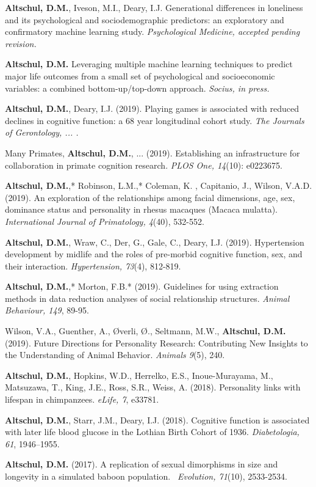 \documentclass[margin,line]{res}
\begin{document}
\begin{resume}
{\bf Altschul, D.M.}, Iveson, M.I., Deary, I.J. Generational differences in loneliness and its psychological and sociodemographic predictors: an exploratory and confirmatory machine learning study. {\it Psychological Medicine, accepted pending revision.}

{\bf Altschul, D.M.}  Leveraging multiple machine learning techniques to predict major life outcomes from a small set of psychological and socioeconomic variables: a combined bottom-up/top-down approach. {\it Socius, in press.}

{\bf Altschul, D.M.}, Deary, I.J. (2019). Playing games is associated with reduced declines in cognitive function: a 68 year longitudinal cohort study. {\it The Journals of Gerontology, ... .}

Many Primates, {\bf Altschul, D.M.}, ... (2019). Establishing an infrastructure for collaboration in primate cognition research. {\it PLOS One, 14}(10): e0223675.

{\bf Altschul, D.M.},* Robinson, L.M.,* Coleman, K. , Capitanio, J., Wilson, V.A.D. (2019). An exploration of the relationships among facial dimensions, age, sex, dominance
status and personality in rhesus macaques (Macaca mulatta). {\it International Journal of Primatology, 4}(40), 532-552.

{\bf Altschul, D.M.}, Wraw, C., Der, G., Gale, C., Deary, I.J. (2019). Hypertension development by midlife and the roles of pre-morbid cognitive function, sex, and their interaction. {\it Hypertension, 73}(4), 812-819.

{\bf Altschul, D.M.},* Morton, F.B.* (2019). Guidelines for using extraction methods in data reduction analyses of social relationship structures.  {\it Animal Behaviour, 149}, 89-95.

Wilson, V.A., Guenther, A., Øverli, Ø., Seltmann, M.W., {\bf Altschul, D.M.} (2019). Future Directions for Personality Research: Contributing New Insights to the Understanding of Animal Behavior. {\it Animals 9}(5), 240.

{\bf Altschul, D.M.}, Hopkins, W.D., Herrelko, E.S., Inoue-Murayama, M., Matsuzawa, T., King, J.E., Ross, S.R., Weiss, A. (2018). Personality links with lifespan in chimpanzees. {\it eLife, 7}, e33781.

{\bf Altschul, D.M.}, Starr, J.M., Deary, I.J. (2018). Cognitive function is associated with later life blood glucose in the Lothian Birth Cohort of 1936. {\it Diabetologia, 61}, 1946–1955.

{\bf Altschul, D.M.} (2017). A replication of sexual dimorphisms in size and longevity in a simulated baboon population. {\it\ Evolution, 71}(10), 2533-2534.


\end{resume}
\end{document}
